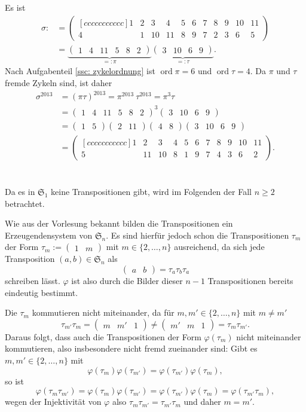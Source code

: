 \documentclass[a4paper,10pt]{article}
\theoremstyle{definition}
\newcommand{\Sn}{\mathfrak{S}}
\newcommand{\ord}{\operatorname{ord}}
\newcommand{\vect}[1]{\begin{pmatrix}#1\end{pmatrix}}
\begin{document}
\subsection{}
Es ist
\begin{align*}
 \sigma :&=
 \begin{pmatrix}[ccccccccccc]
  1 & 2 &  3 &  4 & 5 & 6 & 7 & 8 & 9 & 10 & 11\\
  4 & 1 & 10 & 11 & 8 & 9 & 7 & 2 & 3 &  6 & 5
 \end{pmatrix} \\
 &= \underbrace{\vect{1 & 4 & 11 & 5 & 8 & 2}}_{=: \pi} \underbrace{\vect{3 & 10 & 6 & 9}}_{=: \tau}.
\end{align*}
Nach Aufgabenteil \ref{ssc: zykelordnung} ist $\ord \pi = 6$ und $\ord \tau = 4$.
Da $\pi$ und $\tau$ fremde Zykeln sind, ist daher
\begin{align*}
 \sigma^{2013}
 &= (\pi \tau)^{2013}
 = \pi^{2013}\ \tau^{2013}
 = \pi^3 \tau \\
 &= \vect{1 & 4 & 11 & 5 & 8 & 2}^3 \vect{3 & 10 & 6 & 9} \\
 &= \vect{1 & 5} \vect{2 & 11} \vect{4 & 8} \vect{3 & 10 & 6 & 9} \\
 &=
 \begin{pmatrix}[ccccccccccc]
  1 &  2 &  3 & 4 & 5 & 6 & 7 & 8 & 9 & 10 & 11\\
  5 & 11 & 10 & 8 & 1 & 9 & 7 & 4 & 3 &  6 &  2
 \end{pmatrix}.
\end{align*}





\section{}
Da es in $\Sn_1$ keine Transpositionen gibt, wird im Folgenden der Fall $n \geq 2$ betrachtet.

Wie aus der Vorlesung bekannt bilden die Transpositionen ein Erzeugendensystem von $\Sn_n$. Es sind hierfür jedoch schon die Transpositionen $\tau_m$ der Form $\tau_m := \vect{1 & m}$ mit \mbox{$m \in \{2, \ldots, n\}$} ausreichend, da sich jede Transposition $(a,b) \in \Sn_n$ als
\[
 \vect{a & b} = \tau_a \tau_b \tau_a
\]
schreiben lässt. $\varphi$ ist also durch die Bilder dieser $n-1$ Transpositionen bereits eindeutig bestimmt.

Die $\tau_m$ kommutieren nicht miteinander, da für $m, m' \in \{2,\ldots,n\}$ mit $m \neq m'$
\[
 \tau_{m'} \tau_m = \vect{m & m' & 1} \neq \vect{m' & m & 1} = \tau_m \tau_{m'}.
\]
Daraus folgt, dass auch die Transpositionen der Form $\varphi(\tau_m)$ nicht miteinander kommutieren, also insbesondere nicht fremd zueinander sind: Gibt es $m, m' \in \{2, \ldots, n\}$ mit
\[
 \varphi(\tau_m)\varphi(\tau_{m'}) = \varphi(\tau_{m'})\varphi(\tau_m),
\]
so ist
\[
 \varphi(\tau_m \tau_{m'})
 = \varphi(\tau_m)\varphi(\tau_{m'})
 = \varphi(\tau_{m'})\varphi(\tau_m)
 = \varphi(\tau_{m'} \tau_m),
\]
wegen der Injektivität von $\varphi$ also $\tau_m \tau_{m'} = \tau_{m'} \tau_m$ und daher $m = m'$.
\end{document}
